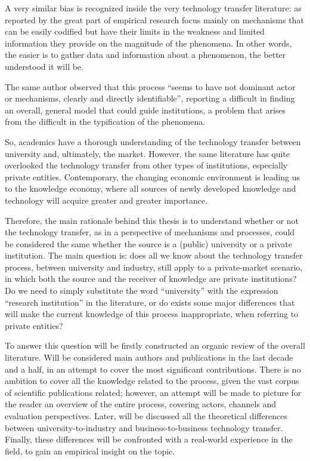 A very similar bias is recognized inside the very technology transfer literature: as reported by \citet{Muscio2008} the great part of empirical research focus mainly on mechanisms that can be easily codified but have their limits in the weakness and limited information they provide on the magnitude of the phenomena. In other words, the easier is to gather data and information about a phenomenon, the better understood it will be. 

The same author observed that this process \enquote{seems to have not dominant actor or mechanisms, clearly and directly identifiable}, reporting a difficult in finding an overall, general model that could guide institutions, a problem that arises from the difficult in the typification of the phenomena.

So, academics have a thorough understanding of the technology transfer between university and, ultimately, the market. However, the same literature has quite overlooked the technology transfer from other types of institutions, especially private entities. Contemporary, the changing economic environment is leading us to the knowledge economy, where all sources of newly developed knowledge and technology will acquire greater and greater importance. 

Therefore, the main rationale behind this thesis is to understand whether or not the technology transfer, as in a perspective of mechanisms and processes, could be considered the same whether the source is a (public) university or a private institution. The main question is: does all we know about the technology transfer process, between university and industry, still apply to a private-market scenario, in which both the source and the receiver of knowledge are private institutions? Do we need to simply substitute the word \enquote{university} with the expression \enquote{research institution} in the literature, or do exists some major differences that will make the current knowledge of this process inappropriate, when referring to private entities?

To answer this question will be firstly constructed an organic review of the overall literature. Will be considered main authors and publications in the last decade and a half, in an attempt to cover the most significant contributions. There is no ambition to cover all the knowledge related to the process, given the vast corpus of scientific publications related; however, an attempt will be made to picture for the reader an overview of the entire process, covering actors, channels and evaluation perspectives. Later, will be discussed all the theoretical differences between university-to-industry and business-to-business technology transfer. Finally, these differences will be confronted with a real-world experience in the field, to gain an empirical insight on the topic.

